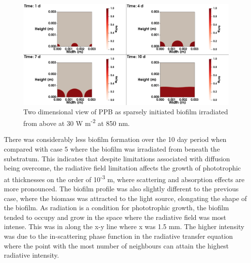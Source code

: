 \begin{figure}[H]
    \centering
    \hspace*{-1cm}\includegraphics[width=1.1\textwidth,height=0.4\textheight]{Chap4/methods/data/figures/case6_ppb_frac.png}
    \caption{Two dimensional view of PPB as sparsely initiated biofilm irradiated from above at 30 W m\textsuperscript{-2} at 850 nm.} 
    \label{fig:case6_ppb_frac}
\end{figure}
There was considerably less biofilm formation over the 10 day period when compared with case 5 where the biofilm was irradiated from beneath the substratum. This indicates that despite limitations associated with diffusion being overcome, the radiative field limitation affects the growth of phototrophic at thicknesses on the order of 10\textsuperscript{-3} m, where scattering and absorption effects are more pronounced. The biofilm profile was also slightly different to the previous case, where the biomass was attracted to the light source, elongating the shape of the biofilm. As radiation is a condition for phototrophic growth, the biofilm tended to occupy and grow in the space where the radiative field was most intense. This was in along the x-y line where x was 1.5 mm. The higher intensity was due to the in-scattering phase function in the radiative transfer equation where the point with the most number of neighbours can attain the highest radiative intensity. 



